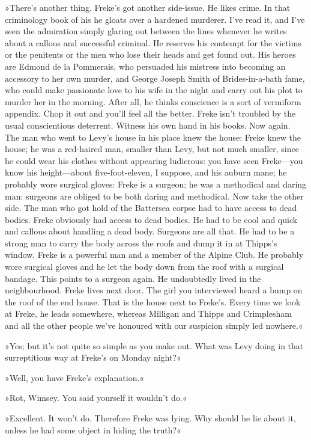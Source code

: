 »There's another thing. Freke's got another side-issue. He likes crime. In that criminology book of his he gloats over a hardened murderer. I've read it, and I've seen the admiration simply glaring out between the lines whenever he writes about a callous and successful criminal. He reserves his contempt for the victims or the penitents or the men who lose their heads and get found out. His heroes are Edmond de la Pommerais, who persuaded his mistress into becoming an accessory to her own murder, and George Joseph Smith of Brides-in-a-bath fame, who could make passionate love to his wife in the night and carry out his plot to murder her in the morning. After all, he thinks conscience is a sort of vermiform appendix. Chop it out and you'll feel all the better. Freke isn't troubled by the usual conscientious deterrent. Witness his own hand in his books. Now again. The man who went to Levy's house in his place knew the house: Freke knew the house; he was a red-haired man, smaller than Levy, but not much smaller, since he could wear his clothes without appearing ludicrous: you have seen Freke—you know his height—about five-foot-eleven, I suppose, and his auburn mane; he probably wore surgical gloves: Freke is a surgeon; he was a methodical and daring man: surgeons are obliged to be both daring and methodical. Now take the other side. The man who got hold of the Battersea corpse had to have access to dead bodies. Freke obviously had access to dead bodies. He had to be cool and quick and callous about handling a dead body. Surgeons are all that. He had to be a strong man to carry the body across the roofs and dump it in at Thipps's window. Freke is a powerful man and a member of the Alpine Club. He probably wore surgical gloves and he let the body down from the roof with a surgical bandage. This points to a surgeon again. He undoubtedly lived in the neighbourhood. Freke lives next door. The girl you interviewed heard a bump on the roof of the end house. That is the house next to Freke's. Every time we look at Freke, he leads somewhere, whereas Milligan and Thipps and Crimplesham and all the other people we've honoured with our suspicion simply led nowhere.«

»Yes; but it's not quite so simple as you make out. What was Levy doing in that surreptitious way at Freke's on Monday night?«

»Well, you have Freke's explanation.«

»Rot, Wimsey. You said yourself it wouldn't do.«

»Excellent. It won't do. Therefore Freke was lying. Why should he lie about it, unless he had some object in hiding the truth?«

